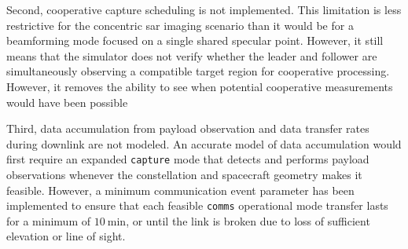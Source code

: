 Second, cooperative capture scheduling is not implemented. This limitation is less restrictive for the concentric \gls{sar} imaging scenario than it would be for a beamforming mode focused on a single shared specular point. However, it still means that the simulator does not verify whether the leader and follower are simultaneously observing a compatible target region for cooperative processing. However, it removes the ability to see when potential cooperative measurements would have been possible 

Third, data accumulation from payload observation and data transfer rates during downlink are not modeled. An accurate model of data accumulation would first require an expanded \texttt{capture} mode that detects and performs payload observations whenever the constellation and spacecraft geometry makes it feasible. However, a minimum communication event parameter has been implemented to ensure that each feasible \texttt{comms} operational mode transfer lasts for a minimum of $10~\mathrm{min}$, or until the link is broken due to loss of sufficient elevation or line of sight. 

